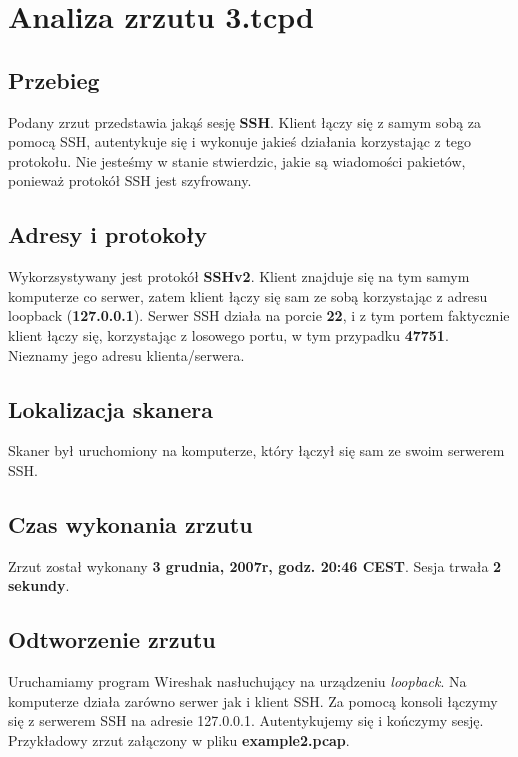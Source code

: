 \documentclass{article}
\begin{document}
\section{Analiza zrzutu 3.tcpd}

\subsection{Przebieg}
Podany zrzut przedstawia jakąś sesję \textbf{SSH}. Klient łączy się z samym sobą za pomocą SSH, autentykuje się i wykonuje
jakieś działania korzystając z tego protokołu. Nie jesteśmy w stanie stwierdzic, jakie
są wiadomości pakietów, ponieważ protokół SSH jest szyfrowany.

\subsection{Adresy i protokoły}
Wykorzsystywany jest protokół \textbf{SSHv2}. Klient znajduje się na tym samym komputerze co serwer,
zatem klient łączy się sam ze sobą korzystając z adresu loopback (\textbf{127.0.0.1}). Serwer 
SSH działa na porcie \textbf{22}, i z tym portem faktycznie klient łączy się, korzystając
z losowego portu, w tym przypadku \textbf{47751}. Nieznamy jego adresu klienta/serwera.

\subsection{Lokalizacja skanera}
Skaner był uruchomiony na komputerze, który łączył się sam ze swoim serwerem SSH.

\subsection{Czas wykonania zrzutu}
Zrzut został wykonany \textbf{3 grudnia, 2007r, godz. 20:46 CEST}. Sesja trwała \textbf{2 sekundy}.

\subsection{Odtworzenie zrzutu}
Uruchamiamy program Wireshak nasłuchujący na urządzeniu \textit{loopback}. Na komputerze działa
zarówno serwer jak i klient SSH. Za pomocą konsoli łączymy się z serwerem SSH na adresie
127.0.0.1. Autentykujemy się i kończymy sesję. Przykładowy zrzut załączony w pliku \textbf{example2.pcap}.
\end{document}
